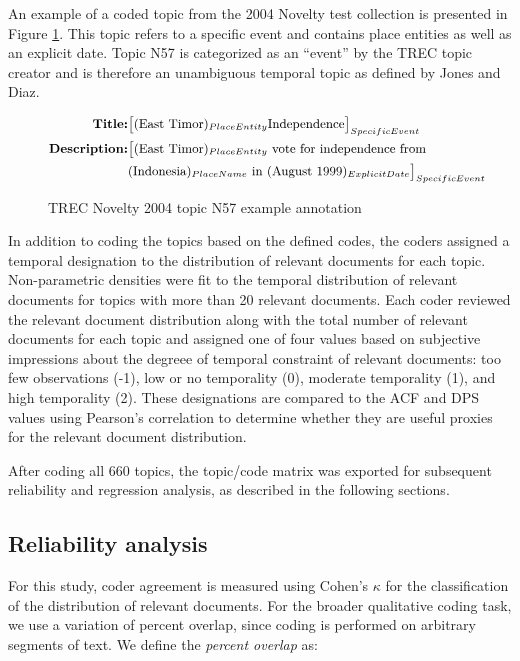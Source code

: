 \documentclass[runningheads,a4paper]{llncs}
\begin{document}
An example of a coded topic from the 2004 Novelty test collection is presented in Figure \ref{fig.example}.  This topic refers to a specific event and contains place entities as well as an explicit date.  Topic N57 is categorized as an ``event'' by the TREC topic creator and is therefore an unambiguous temporal topic as defined by Jones and Diaz.

\begin{figure}
\begin{equation*}
\small
\begin{split}
\mbox{\bf{Title}:} & \big[(\mbox{East Timor})_{PlaceEntity} \mbox{Independence}\big]_{SpecificEvent} \\
\mbox{\bf{Description}:} & \big[  (\mbox{East Timor})_{PlaceEntity} \mbox{ vote for independence from } \\
	& (\mbox{Indonesia})_{PlaceName} \mbox{ in } (\mbox{August 1999})_{ExplicitDate}\big]_{SpecificEvent}
\end{split}
\end{equation*}
\caption{TREC Novelty 2004 topic N57 example annotation}
\label{fig.example}
\end{figure}

In addition to coding the topics based on the defined codes, the coders assigned a temporal designation to the distribution of relevant documents for each topic. Non-parametric densities were fit to the temporal distribution of relevant documents for topics with more than 20 relevant documents. Each coder reviewed the relevant document distribution along with the total number of relevant documents for each topic and assigned one of four values based on subjective impressions about the degreee of temporal constraint of relevant documents:  too few observations (-1), low or no temporality (0), moderate temporality (1), and high temporality (2). These designations are compared to the ACF and DPS values using Pearson's correlation to determine whether they are useful proxies for the relevant document distribution.
 
After coding all 660 topics, the topic/code matrix was exported for subsequent reliability and regression analysis, as described in the following sections. 

\subsection{Reliability analysis}

For this study, coder agreement is measured using Cohen's $\kappa$ for the classification of the distribution of relevant documents. For the broader qualitative coding task, we use a variation of percent overlap, since coding is performed on arbitrary segments of text. We define the \emph{percent overlap} as:
\end{document}
